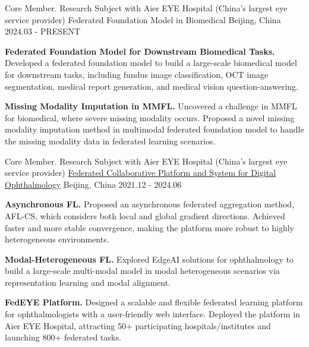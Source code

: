 \begin{cventries}

\cventry
{Core Member. Research Subject with Aier EYE Hospital (China's largest eye service provider)}
{Federated Foundation Model in Biomedical}
{Beijing, China}
{2024.03 - PRESENT}
{
\begin{cvitems}
\item {\textbf{Federated Foundation Model for Downstream Biomedical Tasks.} Developed a federated foundation model to build a large-scale biomedical model for downstream tasks, including fundus image classification, OCT image segmentation, medical report generation, and medical vision question-answering.}
\item {\textbf{Missing Modality Imputation in MMFL.} Uncovered a challenge in MMFL for biomedical, where severe missing modality occurs. Proposed a novel missing modality imputation method in multimodal federated foundation model to handle the missing modality data in federated learning scenarios.}
\end{cvitems}
}

\cventry
{Core Member. Research Subject with Aier EYE Hospital (China's largest eye service provider)}
{\href{https://fedeye.aierchina.com/}{Federated Collaborative Platform and System for Digital Ophthalmology}}
{Beijing, China}
{2021.12 - 2024.06}
{
\begin{cvitems}
\item {\textbf{Asynchronous FL.} Proposed an asynchronous federated aggregation method, AFL-CS, which considers both local and global gradient directions. Achieved faster and more stable convergence, making the platform more robust to highly heterogeneous environments.}
\item {\textbf{Modal-Heterogeneous FL.} Explored EdgeAI solutions for ophthalmology to build a large-scale multi-modal model in modal heterogeneous scenarios via representation learning and modal alignment.}
\item {\textbf{FedEYE Platform.} Designed a scalable and flexible federated learning platform for ophthalmologists with a user-friendly web interface. Deployed the platform in Aier EYE Hospital, attracting \textcolor{awesome-red}{50+} participating hospitals/institutes and launching \textcolor{awesome-red}{800+} federated tasks.}
\end{cvitems}
}


\end{cventries}
